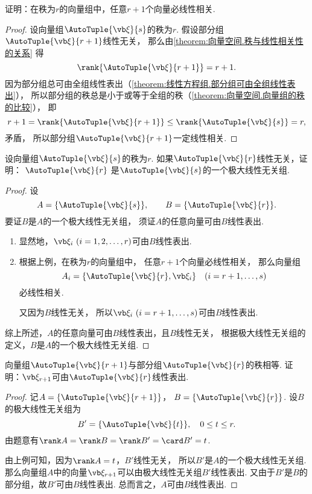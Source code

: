 \begin{example}\label{example:向量空间.若部分组向量个数多于全组的秩则部分组必线性相关}
证明：在秩为\(r\)的向量组中，任意\(r+1\)个向量必线性相关.
\begin{proof}
设向量组\(\AutoTuple{\a}{s}\)的秩为\(r\).
假设部分组\(\AutoTuple{\a}{r+1}\)线性无关，
那么由\cref{theorem:向量空间.秩与线性相关性的关系} 得\[
	\rank\{\AutoTuple{\a}{r+1}\} = r+1.
\]
因为部分组总可由全组线性表出（\cref{theorem:线性方程组.部分组可由全组线性表出}），
所以部分组的秩总是小于或等于全组的秩（\cref{theorem:向量空间.向量组的秩的比较}），
即\[
	r+1 = \rank\{\AutoTuple{\a}{r+1}\} \leq \rank\{\AutoTuple{\a}{s}\} = r,
\]矛盾，
所以部分组\(\AutoTuple{\a}{r+1}\)一定线性相关.
\end{proof}
\end{example}

\begin{example}
设向量组\(\AutoTuple{\a}{s}\)的秩为\(r\).
如果\(\AutoTuple{\a}{r}\)线性无关，证明：
\(\AutoTuple{\a}{r}\)
是\(\AutoTuple{\a}{s}\)的一个极大线性无关组.
\begin{proof}
设\[
	A=\{\AutoTuple{\a}{s}\},
	\qquad
	B=\{\AutoTuple{\a}{r}\}.
\]
要证\(B\)是\(A\)的一个极大线性无关组，
须证\(A\)的任意向量可由\(B\)线性表出.

\begin{enumerate}
	\item 显然地，\(\a_i\ (i=1,2,\dotsc,r)\)可由\(B\)线性表出.

	\item 根据上例，在秩为\(r\)的向量组中，
	任意\(r+1\)个向量必线性相关，
	那么向量组\[
		A_i = \{\AutoTuple{\a}{r},\a_i\}\quad(i=r+1,\dotsc,s)
	\]必线性相关.

	又因为\(B\)线性无关，
	所以\(\a_i\ (i=r+1,\dotsc,s)\)可由\(B\)线性表出.
\end{enumerate}

综上所述，\(A\)的任意向量可由\(B\)线性表出，且\(B\)线性无关，
根据极大线性无关组的定义，\(B\)是\(A\)的一个极大线性无关组.
\end{proof}
\end{example}

\begin{example}
向量组\(\AutoTuple{\a}{r+1}\)与部分组\(\AutoTuple{\a}{r}\)的秩相等.
证明：\(\a_{r+1}\)可由\(\AutoTuple{\a}{r}\)线性表出.
\begin{proof}
记\(A=\{\AutoTuple{\a}{r+1}\}\)，
\(B=\{\AutoTuple{\a}{r}\}\).
设\(B\)的极大线性无关组为\[
	B'=\{\AutoTuple{\a}{t}\},
	\quad 0 \leq t \leq r.
\]
由题意有\(\rank A = \rank B = \rank B' = \card B' = t\).

由上例可知，因为\(\rank A = t\)，\(B'\)线性无关，
所以\(B'\)是\(A\)的一个极大线性无关组.
那么向量组\(A\)中的向量\(\a_{r+1}\)可以由极大线性无关组\(B'\)线性表出.
又由于\(B'\)是\(B\)的部分组，故\(B'\)可由\(B\)线性表出.
总而言之，\(A\)可由\(B\)线性表出.
\end{proof}
\end{example}

